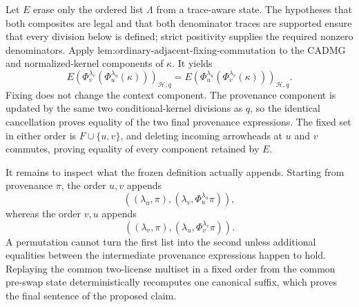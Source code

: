Let \(E\) erase only the ordered list \(\Lambda\) from a trace-aware state. The hypotheses that both composites are legal and that both denominator traces are supported ensure that every division below is defined; strict positivity supplies the required nonzero denominators. Apply \(\text{lem:ordinary-adjacent-fixing-commutation}\) to the CADMG and normalized-kernel components of \(\kappa\). It yields
\[
E\!\left(\Phi_v^{\lambda_v}(\Phi_u^{\lambda_u}(\kappa))\right)_{\mathcal H,q}
=
E\!\left(\Phi_u^{\lambda_u}(\Phi_v^{\lambda_v}(\kappa))\right)_{\mathcal H,q}.
\]
Fixing does not change the context component. The provenance component is updated by the same two conditional-kernel divisions as \(q\), so the identical cancellation proves equality of the two final provenance expressions. The fixed set in either order is \(F\cup\{u,v\}\), and deleting incoming arrowheads at \(u\) and \(v\) commutes, proving equality of every component retained by \(E\).

It remains to inspect what the frozen definition actually appends. Starting from provenance \(\pi\), the order \(u,v\) appends
\[
((\lambda_u,\pi),(\lambda_v,\Phi_u^{\lambda_u}\pi)),
\]
whereas the order \(v,u\) appends
\[
((\lambda_v,\pi),(\lambda_u,\Phi_v^{\lambda_v}\pi)).
\]
A permutation cannot turn the first list into the second unless additional equalities between the intermediate provenance expressions happen to hold. Replaying the common two-license multiset in a fixed order from the common pre-swap state deterministically recomputes one canonical suffix, which proves the final sentence of the proposed claim.
